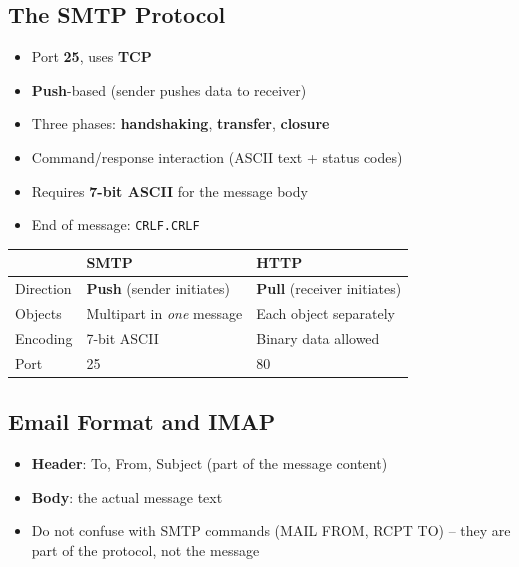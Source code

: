\subsection{The SMTP Protocol}

\begin{keybox}
\begin{itemize}[noitemsep]
    \item Port \textbf{25}, uses \textbf{TCP}
    \item \textbf{Push}-based (sender pushes data to receiver)
    \item Three phases: \textbf{handshaking}, \textbf{transfer}, \textbf{closure}
    \item Command/response interaction (ASCII text + status codes)
    \item Requires \textbf{7-bit ASCII} for the message body
    \item End of message: \texttt{CRLF.CRLF}
\end{itemize}
\end{keybox}

\begin{warnbox}
\begin{tabular}{lll}
\toprule
& \textbf{SMTP} & \textbf{HTTP} \\
\midrule
Direction & \textbf{Push} (sender initiates) & \textbf{Pull} (receiver initiates) \\
Objects & Multipart in \textit{one} message & Each object separately \\
Encoding & 7-bit ASCII & Binary data allowed \\
Port & 25 & 80 \\
\bottomrule
\end{tabular}
\end{warnbox}

\subsection{Email Format and IMAP}

\begin{keybox}
\begin{itemize}[noitemsep]
    \item \textbf{Header}: To, From, Subject (part of the message content)
    \item \textbf{Body}: the actual message text
    \item Do not confuse with SMTP commands (MAIL FROM, RCPT TO) -- they are part of the protocol, not the message
\end{itemize}
\end{keybox}

